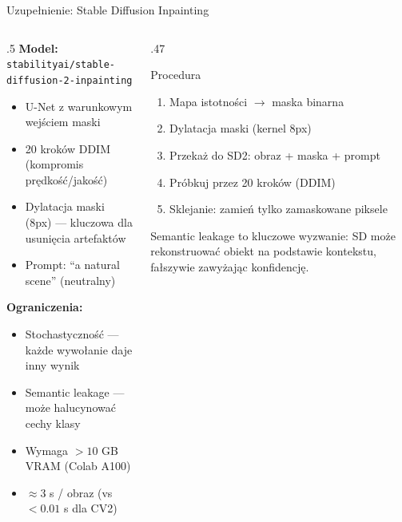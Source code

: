 \documentclass[aspectratio=169, 12pt]{beamer}
\begin{document}
\begin{frame}{Uzupełnienie: Stable Diffusion Inpainting}
  \begin{columns}[T]
    \begin{column}{.5\textwidth}
      \textbf{Model:} \texttt{stabilityai/stable-diffusion-2-inpainting}
      \begin{itemize}
        \item U-Net z warunkowym wejściem maski
        \item 20 kroków DDIM (kompromis prędkość/jakość)
        \item Dylatacja maski (8px) — kluczowa dla usunięcia artefaktów
        \item Prompt: ``a natural scene'' (neutralny)
      \end{itemize}
      \vspace{6pt}
      \textbf{Ograniczenia:}
      \begin{itemize}
        \item Stochastyczność — każde wywołanie daje inny wynik
        \item Semantic leakage — może halucynować cechy klasy
        \item Wymaga $>10$ GB VRAM (Colab A100)
        \item $\approx 3$ s / obraz (vs $<0.01$ s dla CV2)
      \end{itemize}
    \end{column}
    \begin{column}{.47\textwidth}
      \begin{block}{Procedura}
        \begin{enumerate}
          \item Mapa istotności $\rightarrow$ maska binarna
          \item Dylatacja maski (kernel 8px)
          \item Przekaż do SD2: obraz + maska + prompt
          \item Próbkuj przez 20 kroków (DDIM)
          \item Sklejanie: zamień tylko zamaskowane piksele
        \end{enumerate}
      \end{block}
      \vspace{4pt}
      \small
      Semantic leakage to kluczowe wyzwanie: SD może rekonstruować
      obiekt na podstawie kontekstu, fałszywie zawyżając konfidencję.
    \end{column}
  \end{columns}
\end{frame}
\end{document}
